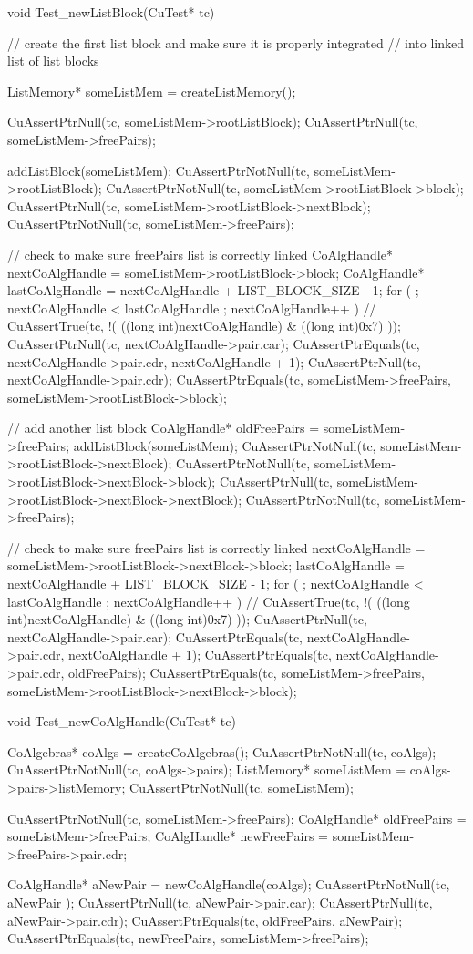 void Test_newListBlock(CuTest* tc) {
  // create the first list block and make sure it is properly integrated
  // into linked list of list blocks

  ListMemory* someListMem = createListMemory();

  CuAssertPtrNull(tc, someListMem->rootListBlock);
  CuAssertPtrNull(tc, someListMem->freePairs);

  addListBlock(someListMem);
  CuAssertPtrNotNull(tc, someListMem->rootListBlock);
  CuAssertPtrNotNull(tc, someListMem->rootListBlock->block);
  CuAssertPtrNull(tc, someListMem->rootListBlock->nextBlock);
  CuAssertPtrNotNull(tc, someListMem->freePairs);

  // check to make sure freePairs list is correctly linked
  CoAlgHandle* nextCoAlgHandle = someListMem->rootListBlock->block;
  CoAlgHandle* lastCoAlgHandle = nextCoAlgHandle + LIST_BLOCK_SIZE - 1;
  for ( ; nextCoAlgHandle < lastCoAlgHandle ; nextCoAlgHandle++ ) {
//    CuAssertTrue(tc, !( ((long int)nextCoAlgHandle) & ((long int)0x7) ));
    CuAssertPtrNull(tc, nextCoAlgHandle->pair.car);
    CuAssertPtrEquals(tc, nextCoAlgHandle->pair.cdr, nextCoAlgHandle + 1);
  }
  CuAssertPtrNull(tc, nextCoAlgHandle->pair.cdr);
  CuAssertPtrEquals(tc, someListMem->freePairs, someListMem->rootListBlock->block);

  // add another list block
  CoAlgHandle* oldFreePairs = someListMem->freePairs;
  addListBlock(someListMem);
  CuAssertPtrNotNull(tc, someListMem->rootListBlock->nextBlock);
  CuAssertPtrNotNull(tc, someListMem->rootListBlock->nextBlock->block);
  CuAssertPtrNull(tc, someListMem->rootListBlock->nextBlock->nextBlock);
  CuAssertPtrNotNull(tc, someListMem->freePairs);

  // check to make sure freePairs list is correctly linked
  nextCoAlgHandle = someListMem->rootListBlock->nextBlock->block;
  lastCoAlgHandle = nextCoAlgHandle + LIST_BLOCK_SIZE - 1;
  for ( ; nextCoAlgHandle < lastCoAlgHandle ; nextCoAlgHandle++ ) {
//    CuAssertTrue(tc, !( ((long int)nextCoAlgHandle) & ((long int)0x7) ));
    CuAssertPtrNull(tc, nextCoAlgHandle->pair.car);
    CuAssertPtrEquals(tc, nextCoAlgHandle->pair.cdr, nextCoAlgHandle + 1);
  }
  CuAssertPtrEquals(tc, nextCoAlgHandle->pair.cdr, oldFreePairs);
  CuAssertPtrEquals(tc, someListMem->freePairs, someListMem->rootListBlock->nextBlock->block);
}

void Test_newCoAlgHandle(CuTest* tc) {
  CoAlgebras* coAlgs = createCoAlgebras();
  CuAssertPtrNotNull(tc, coAlgs);
  CuAssertPtrNotNull(tc, coAlgs->pairs);
  ListMemory* someListMem = coAlgs->pairs->listMemory;
  CuAssertPtrNotNull(tc, someListMem);

  CuAssertPtrNotNull(tc, someListMem->freePairs);
  CoAlgHandle* oldFreePairs = someListMem->freePairs;
  CoAlgHandle* newFreePairs = someListMem->freePairs->pair.cdr;

  CoAlgHandle* aNewPair = newCoAlgHandle(coAlgs);
  CuAssertPtrNotNull(tc, aNewPair );
  CuAssertPtrNull(tc, aNewPair->pair.car);
  CuAssertPtrNull(tc, aNewPair->pair.cdr);
  CuAssertPtrEquals(tc, oldFreePairs, aNewPair);
  CuAssertPtrEquals(tc, newFreePairs, someListMem->freePairs);
}

